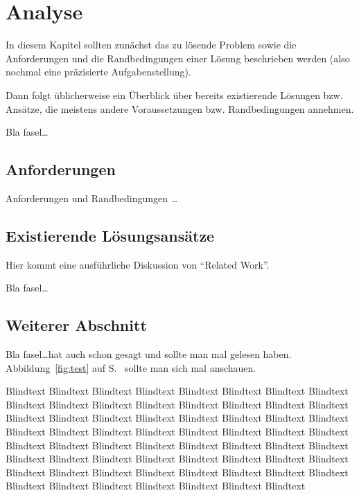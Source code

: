 
\chapter{Analyse}
\label{ch:Analyse}
In diesem Kapitel sollten zunächst das zu lösende Problem
sowie die Anforderungen und die Randbedingungen 
einer Lösung beschrieben werden (also nochmal
eine präzisierte Aufgabenstellung).

Dann folgt üblicherweise ein Überblick über bereits existierende
Lösungen bzw. Ansätze, die meistens andere Voraussetzungen bzw.
Randbedingungen annehmen.

Bla fasel\ldots

\section{Anforderungen}
\label{ch:Analyse:sec:Anforderungen}
Anforderungen und Randbedingungen \ldots

\section{Existierende Lösungsansätze}
\label{ch:Analyse:sec:RelatedWork}

Hier kommt eine ausführliche Diskussion
von "`Related Work"'.

Bla fasel\ldots

\section{Weiterer Abschnitt}
\label{ch:Analyse:sec:Abschnitt}

Bla fasel\ldots hat auch schon \cite{TB2000} gesagt und
\cite{TB98,JSAC96,qosr} sollte man mal gelesen haben.
Abbildung~\ref{fig:test} auf S.~\pageref{fig:test} sollte man
sich mal anschauen.

Blindtext Blindtext Blindtext Blindtext Blindtext Blindtext Blindtext
Blindtext Blindtext Blindtext Blindtext Blindtext Blindtext Blindtext
Blindtext Blindtext Blindtext Blindtext Blindtext Blindtext Blindtext
Blindtext Blindtext Blindtext Blindtext Blindtext Blindtext Blindtext
Blindtext Blindtext Blindtext Blindtext Blindtext Blindtext Blindtext
Blindtext Blindtext Blindtext Blindtext Blindtext Blindtext Blindtext
Blindtext Blindtext Blindtext Blindtext Blindtext Blindtext Blindtext
Blindtext Blindtext Blindtext Blindtext Blindtext Blindtext Blindtext
Blindtext Blindtext Blindtext Blindtext Blindtext Blindtext Blindtext

